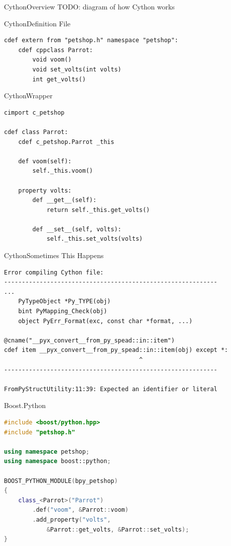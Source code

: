 \documentclass{beamer}
\begin{document}
\begin{frame}{Cython}{Overview}
  TODO: diagram of how Cython works
\end{frame}

\begin{frame}[fragile=singleslide]{Cython}{Definition File}
  \begin{lstlisting}[language=cython]
cdef extern from "petshop.h" namespace "petshop":
    cdef cppclass Parrot:
        void voom()
        void set_volts(int volts)
        int get_volts()
  \end{lstlisting}
\end{frame}

\begin{frame}[fragile=singleslide]{Cython}{Wrapper}
  \begin{lstlisting}[language=cython]
cimport c_petshop

cdef class Parrot:
    cdef c_petshop.Parrot _this

    def voom(self):
        self._this.voom()

    property volts:
        def __get__(self):
            return self._this.get_volts()

        def __set__(self, volts):
            self._this.set_volts(volts)
  \end{lstlisting}
\end{frame}

\begin{frame}[fragile=singleslide]{Cython}{Sometimes This Happens}
  \footnotesize
  \begin{verbatim}
Error compiling Cython file:
------------------------------------------------------------
...
    PyTypeObject *Py_TYPE(obj)
    bint PyMapping_Check(obj)
    object PyErr_Format(exc, const char *format, ...)

@cname("__pyx_convert__from_py_spead::in::item")
cdef item __pyx_convert__from_py_spead::in::item(obj) except *:
                                      ^
------------------------------------------------------------

FromPyStructUtility:11:39: Expected an identifier or literal
  \end{verbatim}
\end{frame}

\begin{frame}[fragile=singleslide]{Boost.Python}
  \begin{lstlisting}[language=c++]
#include <boost/python.hpp>
#include "petshop.h"

using namespace petshop;
using namespace boost::python;

BOOST_PYTHON_MODULE(bpy_petshop)
{
    class_<Parrot>("Parrot")
        .def("voom", &Parrot::voom)
        .add_property("volts",
            &Parrot::get_volts, &Parrot::set_volts);
}
  \end{lstlisting}
\end{frame}
\end{document}
